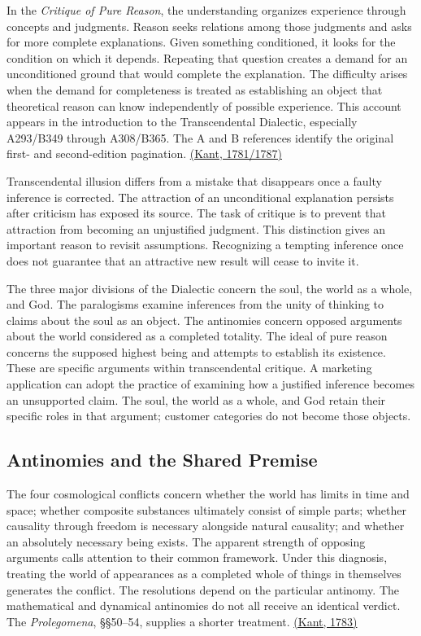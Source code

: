 \noindent \noindent In the \emph{Critique of Pure Reason}, the understanding
organizes experience through concepts and judgments. Reason seeks
relations among those judgments and asks for more complete explanations.
Given something conditioned, it looks for the condition on which it
depends. Repeating that question creates a demand for an unconditioned
ground that would complete the explanation. The difficulty arises when
the demand for completeness is treated as establishing an object that
theoretical reason can know independently of possible experience. This
account appears in the introduction to the Transcendental Dialectic,
especially A293/B349 through A308/B365. The A and B references identify
the original first- and second-edition pagination.
\href{https://www.gutenberg.org/files/4280/4280-h/4280-h.htm}{(Kant,
1781/1787)}

Transcendental illusion differs from a mistake that disappears once a
faulty inference is corrected. The attraction of an unconditional
explanation persists after criticism has exposed its source. The task of
critique is to prevent that attraction from becoming an unjustified
judgment. This distinction gives an important reason to revisit
assumptions. Recognizing a tempting inference once does not guarantee
that an attractive new result will cease to invite it.

The three major divisions of the Dialectic concern the soul, the world
as a whole, and God. The paralogisms examine inferences from the unity
of thinking to claims about the soul as an object. The antinomies
concern opposed arguments about the world considered as a completed
totality. The ideal of pure reason concerns the supposed highest being
and attempts to establish its existence. These are specific arguments
within transcendental critique. A marketing application can adopt the
practice of examining how a justified inference becomes an unsupported
claim. The soul, the world as a whole, and God retain their specific
roles in that argument; customer categories do not become those objects.

\hypertarget{M09-antinomies-and-the-shared-premise}{%
\subsection{Antinomies and the Shared
Premise}\label{M09-antinomies-and-the-shared-premise}}

\noindent \noindent The four cosmological conflicts concern whether the world has
limits in time and space; whether composite substances ultimately
consist of simple parts; whether causality through freedom is necessary
alongside natural causality; and whether an absolutely necessary being
exists. The apparent strength of opposing arguments calls attention to
their common framework. Under this diagnosis, treating the world of
appearances as a completed whole of things in themselves generates the
conflict. The resolutions depend on the particular antinomy. The
mathematical and dynamical antinomies do not all receive an identical
verdict. The \emph{Prolegomena}, §§50--54, supplies a shorter treatment.
\href{https://www.gutenberg.org/files/52821/52821-h/52821-h.htm}{(Kant,
1783)}

